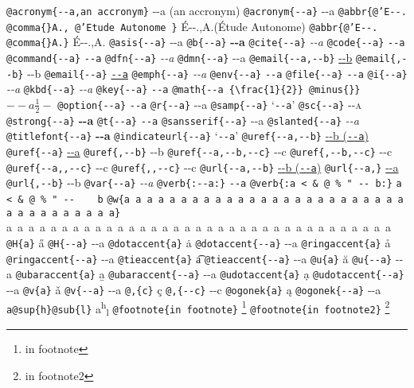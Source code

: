 \documentclass{book}
\begin{document}
\texttt{@acronym\{{-}{-}a,an accronym\}} {-}{-}a (an accronym)
\texttt{@acronym\{{-}{-}a\}} {-}{-}a
\texttt{@abbr\{@'E{-}{-}. @comma\{\}A., @'Etude Autonome \}} \'{E}{-}{-}.\@ ,A.\@ (\'{E}tude Autonome)
\texttt{@abbr\{@'E{-}{-}. @comma\{\}A.\}} \'{E}{-}{-}.\@ ,A.\@
\texttt{@asis\{{-}{-}a\}} {-}{-}a
\texttt{@b\{{-}{-}a\}} \textbf{{-}{-}a}
\texttt{@cite\{{-}{-}a\}} \textit{{-}{-}a}
\texttt{@code\{{-}{-}a\}} \texttt{{-}{-}a}
\texttt{@command\{{-}{-}a\}} \texttt{{-}{-}a}
\texttt{@dfn\{{-}{-}a\}} \emph{{-}{-}a}
\texttt{@dmn\{{-}{-}a\}} {-}{-}a
\texttt{@email\{{-}{-}a,{-}{-}b\}} \href{mailto:--a}{{-}{-}b}
\texttt{@email\{,{-}{-}b\}} {-}{-}b
\texttt{@email\{{-}{-}a\}} \href{mailto:--a}{\nolinkurl{--a}}
\texttt{@emph\{{-}{-}a\}} \emph{{-}{-}a}
\texttt{@env\{{-}{-}a\}} \texttt{{-}{-}a}
\texttt{@file\{{-}{-}a\}} \texttt{{-}{-}a}
\texttt{@i\{{-}{-}a\}} \textit{{-}{-}a}
\texttt{@kbd\{{-}{-}a\}} {\ttfamily\textsl{{-}{-}a}}
\texttt{@key\{{-}{-}a\}} \texttt{{-}{-}a}
\texttt{@math\{{-}{-}a \{\textbackslash{}frac\{1\}\{2\}\} @minus\{\}\}} $--a {\frac{1}{2}} -$
\texttt{@option\{{-}{-}a\}} \texttt{{-}{-}a}
\texttt{@r\{{-}{-}a\}} \textrm{{-}{-}a}
\texttt{@samp\{{-}{-}a\}} `\texttt{{-}{-}a}'
\texttt{@sc\{{-}{-}a\}} \textsc{{-}{-}a}
\texttt{@strong\{{-}{-}a\}} \textbf{{-}{-}a}
\texttt{@t\{{-}{-}a\}} \texttt{{-}{-}a}
\texttt{@sansserif\{{-}{-}a\}} \textsf{{-}{-}a}
\texttt{@slanted\{{-}{-}a\}} \textsl{{-}{-}a}
\texttt{@titlefont\{{-}{-}a\}} {\huge \bfseries {-}{-}a}
\texttt{@indicateurl\{{-}{-}a\}} `\texttt{{-}{-}a}'
\texttt{@uref\{{-}{-}a,{-}{-}b\}} \href{--a}{{-}{-}b (\nolinkurl{--a})}
\texttt{@uref\{{-}{-}a\}} \url{--a}
\texttt{@uref\{,{-}{-}b\}} {-}{-}b
\texttt{@uref\{{-}{-}a,{-}{-}b,{-}{-}c\}} {-}{-}c
\texttt{@uref\{,{-}{-}b,{-}{-}c\}} {-}{-}c
\texttt{@uref\{{-}{-}a,,{-}{-}c\}} {-}{-}c
\texttt{@uref\{,,{-}{-}c\}} {-}{-}c
\texttt{@url\{{-}{-}a,{-}{-}b\}} \href{--a}{{-}{-}b (\nolinkurl{--a})}
\texttt{@url\{{-}{-}a,\}} \url{--a}
\texttt{@url\{,{-}{-}b\}} {-}{-}b
\texttt{@var\{{-}{-}a\}} \emph{{-}{-}a}
\texttt{@verb\{:{-}{-}a:\}} \verb:--a:
\texttt{@verb\{:a  < \& @ \% " {-}{-}    b:\}} \verb:a  < & @ % " --    b:
\texttt{@w\{a a a a a a a a a a a a a a a a a a a a a a a a a a a a a a a a a a a\}} \hbox{a a a a a a a a a a a a a a a a a a a a a a a a a a a a a a a a a a a}
\texttt{@H\{a\}} \H{a}
\texttt{@H\{{-}{-}a\}} \H{{-}{-}a}
\texttt{@dotaccent\{a\}} \.{a}
\texttt{@dotaccent\{{-}{-}a\}} \.{{-}{-}a}
\texttt{@ringaccent\{a\}} \r{a}
\texttt{@ringaccent\{{-}{-}a\}} \r{{-}{-}a}
\texttt{@tieaccent\{a\}} \t{a}
\texttt{@tieaccent\{{-}{-}a\}} \t{{-}{-}a}
\texttt{@u\{a\}} \u{a}
\texttt{@u\{{-}{-}a\}} \u{{-}{-}a}
\texttt{@ubaraccent\{a\}} \b{a}
\texttt{@ubaraccent\{{-}{-}a\}} \b{{-}{-}a}
\texttt{@udotaccent\{a\}} \d{a}
\texttt{@udotaccent\{{-}{-}a\}} \d{{-}{-}a}
\texttt{@v\{a\}} \v{a}
\texttt{@v\{{-}{-}a\}} \v{{-}{-}a}
\texttt{@,\{c\}} \c{c}
\texttt{@,\{{-}{-}c\}} \c{{-}{-}c}
\texttt{@ogonek\{a\}} \k{a}
\texttt{@ogonek\{{-}{-}a\}} \k{{-}{-}a}
\texttt{a@sup\{h\}@sub\{l\}} a\textsuperscript{h}\textsubscript{l}
\texttt{@footnote\{in footnote\}} \footnote{in footnote}
\texttt{@footnote\{in footnote2\}} \footnote{in footnote2}
\end{document}
